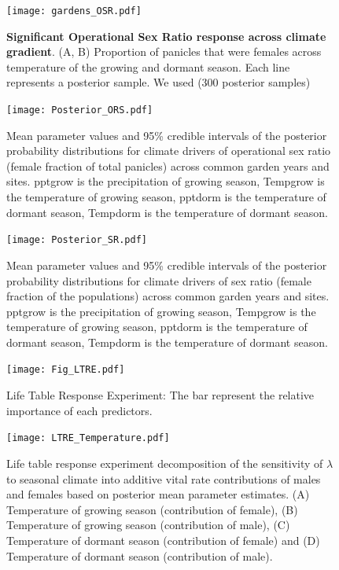 \documentclass[9pt,twoside,lineno]{pnas-new}
\begin{document}
\begin{figure}
\centering
\texttt{[image: gardens\_OSR.pdf]}
\caption{\textbf{Significant Operational Sex Ratio response across climate gradient}.
			(A, B) Proportion of panicles that were females across  temperature of the growing and dormant season.
			Each line represents a  posterior sample. We used (300 posterior samples)  }
\label{Sup:gardens_OSR}
\end{figure}
\clearpage

\begin{figure}
\centering
\texttt{[image: Posterior\_ORS.pdf]}
\caption{Mean parameter values and 95\% credible intervals of the posterior probability distributions for climate drivers of operational sex ratio (female fraction of total panicles) across common garden years and sites. 
		pptgrow is  the precipitation of growing season,
		Tempgrow is the temperature of growing season,
		pptdorm is the temperature of dormant season,
		Tempdorm is the temperature of dormant season.}
\label{Sup:posterior_OSR}
\end{figure}
\clearpage

\begin{figure}
\centering
\texttt{[image: Posterior\_SR.pdf]}
\caption{Mean parameter values and 95\% credible intervals of the posterior probability distributions for climate drivers of sex ratio (female fraction of the populations) across common garden years and sites. 
			pptgrow is  the precipitation of growing season,
			Tempgrow is the temperature of growing season,
			pptdorm is the temperature of dormant season,
			Tempdorm is the temperature of dormant season.}
\label{Sup:posterior_SR}
\end{figure}
\clearpage


\begin{figure}
\centering
\texttt{[image: Fig\_LTRE.pdf]}
\caption{Life Table Response Experiment: The bar represent the relative importance of each predictors.}
\label{Sup:LTRE}
\end{figure}
\clearpage

\begin{figure}
\centering
\texttt{[image: LTRE\_Temperature.pdf]}
\caption{Life table response experiment decomposition of the sensitivity of $\lambda$ to seasonal climate into additive vital rate contributions of males and females based on posterior mean parameter estimates.
			(A) Temperature of growing season (contribution of female), (B) Temperature of growing season (contribution of male),  (C) Temperature of dormant season (contribution of female) and (D) Temperature of dormant season (contribution of male).}
		\label{Sup:LTRETemp}
\end{figure}
\clearpage
\end{document}
